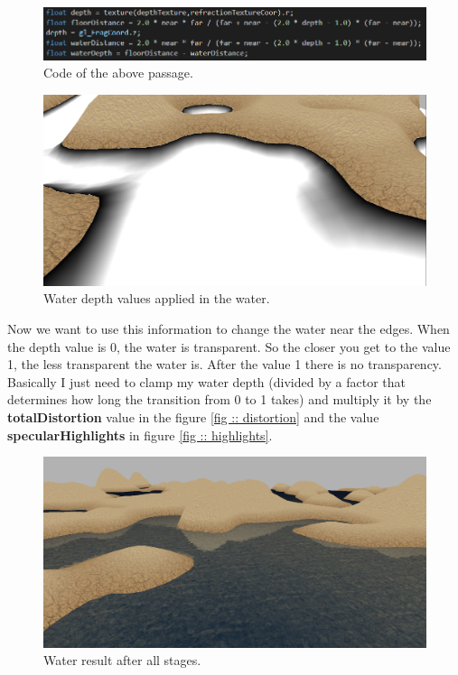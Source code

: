 \begin{figure}[hbt!]
	\centering
	\includegraphics[width= 1
	\textwidth]{images/Water8.png}
	\caption{Code of the above passage.}
\end{figure} 

\begin{figure}[hbt!]
	\centering
	\includegraphics[width= 1
	\textwidth]{images/Water9.png}
	\caption{Water depth values applied in the water.}
\end{figure}

\noindent
Now we want to use this information to change the water near the edges. When the depth value is 0, the water is transparent. So the closer you get to the value 1, the less transparent the water is. After the value 1 there is no transparency.
Basically I just need to clamp my water depth (divided by a factor that determines how long the transition from 0 to 1 takes) and multiply it by the \textbf{totalDistortion} value in the figure \ref {fig :: distortion} and the value \textbf{specularHighlights} in figure \ref {fig :: highlights}.

\newpage

\begin{figure}[hbt!]
	\centering
	\includegraphics[width= 1
	\textwidth]{images/Water10.png}
	\caption{Water result after all stages.}
\end{figure}

